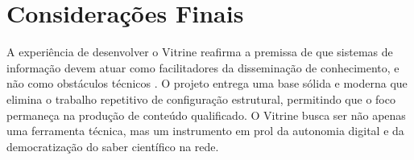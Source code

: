 \section{Considerações Finais}

A experiência de desenvolver o Vitrine reafirma a premissa de que sistemas de informação devem atuar como facilitadores da disseminação de conhecimento, e não como obstáculos técnicos \cite{rainer2019intro}. O projeto entrega uma base sólida e moderna que elimina o trabalho repetitivo de configuração estrutural, permitindo que o foco permaneça na produção de conteúdo qualificado. O Vitrine busca ser não apenas uma ferramenta técnica, mas um instrumento em prol da autonomia digital e da democratização do saber científico na rede.
